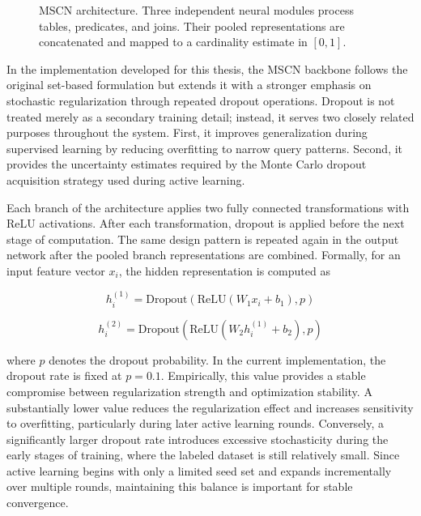\begin{figure}[tb]
{\begin{tikzpicture}[
    node distance=2cm and 3cm,
    block/.style={draw, rectangle, rounded corners=3pt, minimum width=3cm, minimum height=1cm, align=center, font=\small},
    arrow/.style={->, thick, >=stealth},
]
\end{tikzpicture}%
}
\caption{MSCN architecture. Three independent neural modules process tables, predicates, and joins. Their pooled representations are concatenated and mapped to a cardinality estimate in $[0, 1]$.}
\label{fig:mscn_architecture}
\end{figure}

In the implementation developed for this thesis, the MSCN backbone follows the original set-based formulation but extends it with a stronger emphasis on stochastic regularization through repeated dropout operations. Dropout is not treated merely as a secondary training detail; instead, it serves two closely related purposes throughout the system. First, it improves generalization during supervised learning by reducing overfitting to narrow query patterns. Second, it provides the uncertainty estimates required by the Monte Carlo dropout acquisition strategy used during active learning.

Each branch of the architecture applies two fully connected transformations with ReLU activations. After each transformation, dropout is applied before the next stage of computation. The same design pattern is repeated again in the output network after the pooled branch representations are combined. Formally, for an input feature vector $x_i$, the hidden representation is computed as

\begin{equation}
h_i^{(1)} = \text{Dropout}(\text{ReLU}(W_1 x_i + b_1), p)
\end{equation}

\begin{equation}
h_i^{(2)} = \text{Dropout}(\text{ReLU}(W_2 h_i^{(1)} + b_2), p)
\end{equation}

where $p$ denotes the dropout probability. In the current implementation, the dropout rate is fixed at $p = 0.1$. Empirically, this value provides a stable compromise between regularization strength and optimization stability. A substantially lower value reduces the regularization effect and increases sensitivity to overfitting, particularly during later active learning rounds. Conversely, a significantly larger dropout rate introduces excessive stochasticity during the early stages of training, where the labeled dataset is still relatively small. Since active learning begins with only a limited seed set and expands incrementally over multiple rounds, maintaining this balance is important for stable convergence.

